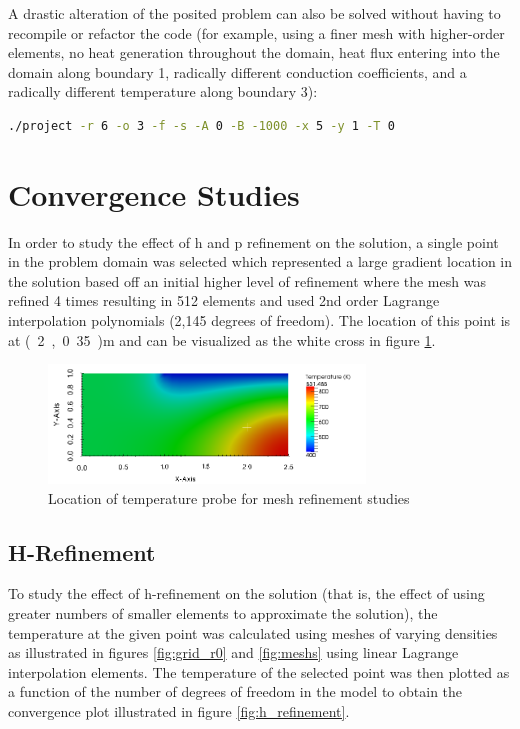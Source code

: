 \documentclass[letterpaper,10pt]{article}
\begin{document}
A drastic alteration of the posited problem can also be solved without having to recompile or refactor the code (for example, using a finer mesh with higher-order elements, no heat generation throughout the domain, heat flux entering into the domain along boundary 1, radically different conduction coefficients, and a radically different temperature along boundary 3):
\vspace{-6mm}
\begin{lstlisting}[numbers=none,frame=none,language=bash]
./project -r 6 -o 3 -f -s -A 0 -B -1000 -x 5 -y 1 -T 0
\end{lstlisting}
\vspace{1mm}

\section{Convergence Studies}
In order to study the effect of h and p refinement on the solution, a single point in the problem domain was selected which represented a large gradient location in the solution based off an initial higher level of refinement where the mesh was refined 4 times resulting in 512 elements and used 2nd order Lagrange interpolation polynomials (2,145 degrees of freedom). The location of this point is at \unit{(2,0.35)}{m} and can be visualized as the white cross in figure \ref{fig:refinepoint}.

\begin{figure}[H]
	\centering
	\includegraphics[width=0.75\textwidth]{refinepoint.png}
	\caption{Location of temperature probe for mesh refinement studies}
	\label{fig:refinepoint}
\end{figure}

\subsection{H-Refinement}
\label{sec:h_refine}
To study the effect of h-refinement on the solution (that is, the effect of using greater numbers of smaller elements to approximate the solution), the temperature at the given point was calculated using meshes of varying densities as illustrated in figures \ref{fig:grid_r0} and \ref{fig:meshs} using linear Lagrange interpolation elements. The temperature of the selected point was then plotted as a function of the number of degrees of freedom in the model to obtain the convergence plot illustrated in figure \ref{fig:h_refinement}.
\end{document}
